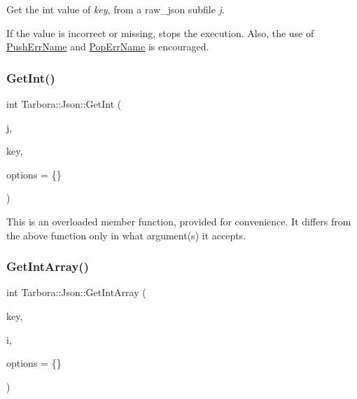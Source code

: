 Get the int value of {\itshape key}, from a raw\+\_\+json subfile {\itshape j}. 

If the value is incorrect or missing, stops the execution. Also, the use of \hyperlink{classTarbora_1_1Json_a061eac4f16dac3b9b3a26a66de0ea8f0}{Push\+Err\+Name} and \hyperlink{classTarbora_1_1Json_a14019f06d3bd76edd6a6e78134519d11}{Pop\+Err\+Name} is encouraged. \mbox{\label{classTarbora_1_1Json_a349f912bf869a053bf9aff26ee76128b}} 
\subsubsection{\texorpdfstring{Get\+Int()}{GetInt()}\hspace{0.1cm}{\footnotesize\ttfamily [3/3]}}
{\footnotesize\ttfamily int Tarbora\+::\+Json\+::\+Get\+Int (\begin{DoxyParamCaption}\item[{raw\+\_\+json}]{j,  }\item[{int}]{key,  }\item[{\hyperlink{structTarbora_1_1JsonOptions}{Json\+Options}}]{options = {\ttfamily \{\}} }\end{DoxyParamCaption})}

This is an overloaded member function, provided for convenience. It differs from the above function only in what argument(s) it accepts. \mbox{\label{classTarbora_1_1Json_af4da581a98f4b6dffc0a71458d810320}} 
\subsubsection{\texorpdfstring{Get\+Int\+Array()}{GetIntArray()}\hspace{0.1cm}{\footnotesize\ttfamily [1/2]}}
{\footnotesize\ttfamily int Tarbora\+::\+Json\+::\+Get\+Int\+Array (\begin{DoxyParamCaption}\item[{const char $\ast$}]{key,  }\item[{int}]{i,  }\item[{\hyperlink{structTarbora_1_1JsonOptions}{Json\+Options}}]{options = {\ttfamily \{\}} }\end{DoxyParamCaption})}



